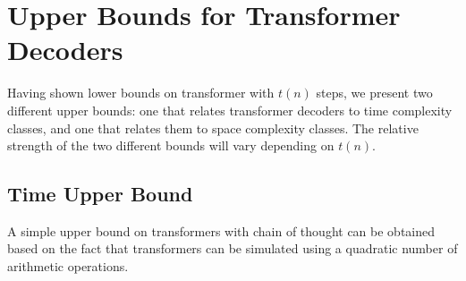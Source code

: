 

\section{Upper Bounds for Transformer Decoders}
\label{sec:upper-bounds}

Having shown lower bounds on transformer with $t(n)$ steps,
we present two different upper bounds: one that relates transformer decoders to time complexity classes, and one that relates them to space complexity classes. The relative strength of the two different bounds will vary depending on $t(n)$.


\subsection{Time Upper Bound}

A simple upper bound on transformers with chain of thought can be obtained based on the fact that transformers can be simulated using a quadratic number of arithmetic operations.


